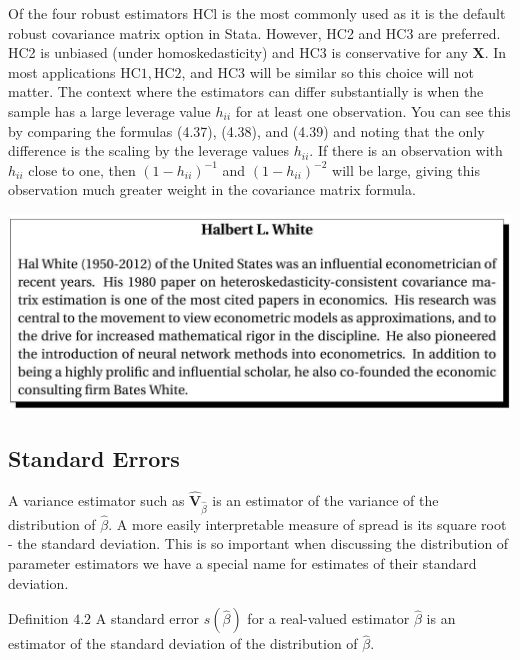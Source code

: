 \documentclass[10pt]{article}
\begin{document}
Of the four robust estimators $\mathrm{HCl}$ is the most commonly used as it is the default robust covariance matrix option in Stata. However, HC2 and HC3 are preferred. HC2 is unbiased (under homoskedasticity) and HC3 is conservative for any $\boldsymbol{X}$. In most applications $\mathrm{HC} 1, \mathrm{HC} 2$, and $\mathrm{HC} 3$ will be similar so this choice will not matter. The context where the estimators can differ substantially is when the sample has a large leverage value $h_{i i}$ for at least one observation. You can see this by comparing the formulas (4.37), (4.38), and (4.39) and noting that the only difference is the scaling by the leverage values $h_{i i}$. If there is an observation with $h_{i i}$ close to one, then $\left(1-h_{i i}\right)^{-1}$ and $\left(1-h_{i i}\right)^{-2}$ will be large, giving this observation much greater weight in the covariance matrix formula.

\includegraphics[max width=\textwidth]{2022_09_17_46fafb30295495354ae2g-19}

\subsection{Standard Errors}
A variance estimator such as $\widehat{\boldsymbol{V}}_{\widehat{\beta}}$ is an estimator of the variance of the distribution of $\widehat{\beta}$. A more easily interpretable measure of spread is its square root - the standard deviation. This is so important when discussing the distribution of parameter estimators we have a special name for estimates of their standard deviation.

Definition $4.2$ A standard error $s(\widehat{\beta})$ for a real-valued estimator $\widehat{\beta}$ is an estimator of the standard deviation of the distribution of $\widehat{\beta}$.
\end{document}
